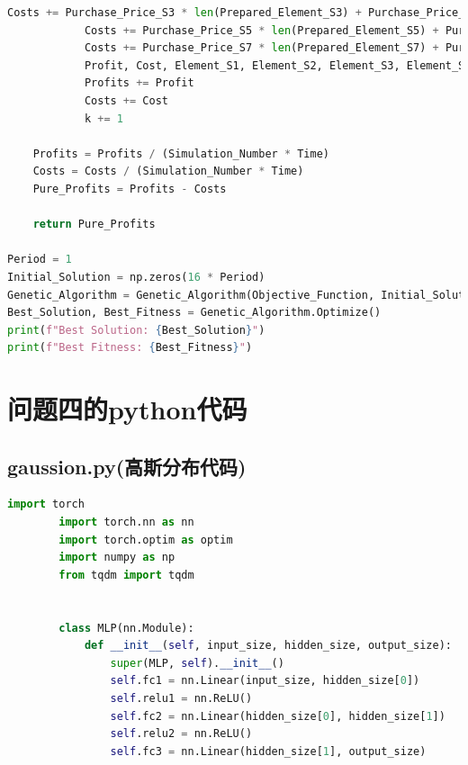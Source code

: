 \documentclass[withoutpreface,bwprint]{cumcmthesis} %
\begin{document}
\begin{appendices}
\begin{lstlisting}[language=python]
            Costs += Purchase_Price_S3 * len(Prepared_Element_S3) + Purchase_Price_S4 * len(Prepared_Element_S4)
            Costs += Purchase_Price_S5 * len(Prepared_Element_S5) + Purchase_Price_S6 * len(Prepared_Element_S6)
            Costs += Purchase_Price_S7 * len(Prepared_Element_S7) + Purchase_Price_S8 * len(Prepared_Element_S8)
            Profit, Cost, Element_S1, Element_S2, Element_S3, Element_S4, Element_S5, Element_S6, Element_S7, Element_S8, Semi_Finished_Product_S1, Semi_Finished_Product_S2, Semi_Finished_Product_S3, Semi_Finished_Product_S1_Form, Semi_Finished_Product_S2_Form, Semi_Finished_Product_S3_Form, Exchange_Quantity = Solve(Element_S1, Element_S2, Element_S3, Element_S4, Element_S5, Element_S6, Element_S7, Element_S8, Semi_Finished_Product_S1, Semi_Finished_Product_S2, Semi_Finished_Product_S3, Semi_Finished_Product_S1_Form, Semi_Finished_Product_S2_Form, Semi_Finished_Product_S3_Form, Decision_Vector, Exchange_Quantity)
            Profits += Profit
            Costs += Cost
            k += 1

    Profits = Profits / (Simulation_Number * Time)
    Costs = Costs / (Simulation_Number * Time)
    Pure_Profits = Profits - Costs

    return Pure_Profits

Period = 1
Initial_Solution = np.zeros(16 * Period)
Genetic_Algorithm = Genetic_Algorithm(Objective_Function, Initial_Solution)
Best_Solution, Best_Fitness = Genetic_Algorithm.Optimize()
print(f"Best Solution: {Best_Solution}")
print(f"Best Fitness: {Best_Fitness}")

\end{lstlisting}
\section{问题四的python代码}
\subsection{gaussion.py(高斯分布代码)}
	\begin{lstlisting}[language=python]
		import torch
		import torch.nn as nn
		import torch.optim as optim
		import numpy as np
		from tqdm import tqdm  
		
		
		class MLP(nn.Module):
			def __init__(self, input_size, hidden_size, output_size):
				super(MLP, self).__init__()
				self.fc1 = nn.Linear(input_size, hidden_size[0])
				self.relu1 = nn.ReLU()
				self.fc2 = nn.Linear(hidden_size[0], hidden_size[1])
				self.relu2 = nn.ReLU()
				self.fc3 = nn.Linear(hidden_size[1], output_size)
		

\end{lstlisting}
\end{appendices}
\end{document}
